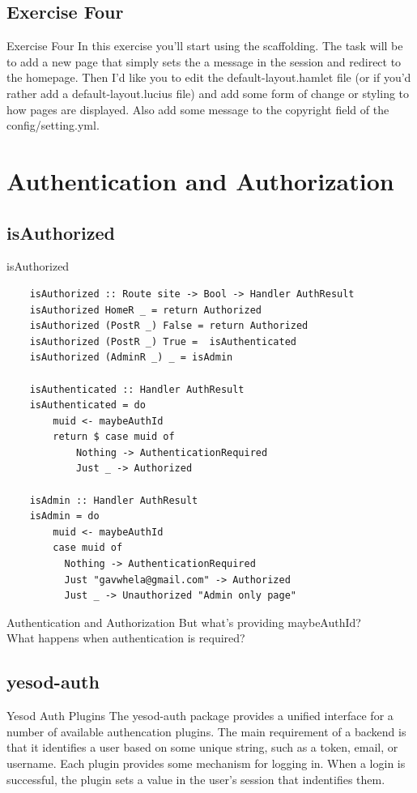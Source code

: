 \documentclass[pdf]{beamer}
\begin{document}
\subsection{Exercise Four}
\begin{frame}[fragile]{Exercise Four}
  In this exercise you'll start using the scaffolding. The task will
  be to add a new page that simply sets the a message in the session
  and redirect to the homepage. Then I'd like you to edit the
  default-layout.hamlet file (or if you'd rather add a
  default-layout.lucius file) and add some form of change or styling
  to how pages are displayed. Also add some message to the copyright
  field of the config/setting.yml.
\end{frame}

\section{Authentication and Authorization}
\subsection{isAuthorized}
\begin{frame}[fragile]{isAuthorized}
  \begin{verbatim}
    isAuthorized :: Route site -> Bool -> Handler AuthResult
    isAuthorized HomeR _ = return Authorized
    isAuthorized (PostR _) False = return Authorized
    isAuthorized (PostR _) True =  isAuthenticated
    isAuthorized (AdminR _) _ = isAdmin

    isAuthenticated :: Handler AuthResult
    isAuthenticated = do
        muid <- maybeAuthId
        return $ case muid of
            Nothing -> AuthenticationRequired
            Just _ -> Authorized

    isAdmin :: Handler AuthResult
    isAdmin = do
        muid <- maybeAuthId
        case muid of
          Nothing -> AuthenticationRequired
          Just "gavwhela@gmail.com" -> Authorized
          Just _ -> Unauthorized "Admin only page"
  \end{verbatim}
\end{frame}

\begin{frame}{Authentication and Authorization}
  But what's providing maybeAuthId?\\
  What happens when authentication is required?\\
\end{frame}

\subsection{yesod-auth}
\begin{frame}{Yesod Auth Plugins}
  The yesod-auth package provides a unified interface for a number of
  available authencation plugins. The main requirement of a backend is
  that it identifies a user based on some unique string, such as a
  token, email, or username. Each plugin provides some mechanism for
  logging in. When a login is successful, the plugin sets a value in
  the user's session that indentifies them.
\end{frame}
\end{document}
